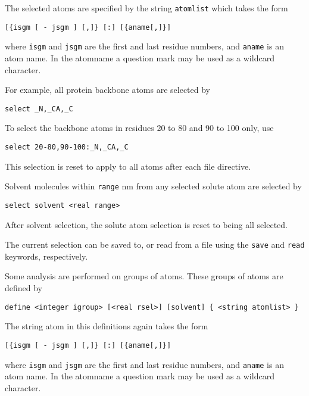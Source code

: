 \par
The selected atoms are specified by the string \verb+atomlist+ which
takes the form

\begin{verbatim}
[{isgm [ - jsgm ] [,]} [:] [{aname[,]}]
\end{verbatim}
where \verb+isgm+ and \verb+jsgm+ are the first and last residue numbers,
and \verb+aname+ is an atom name. In the atomname a question mark may be 
used as a wildcard character. 

For example, all protein backbone atoms are selected by

\begin{verbatim}
select _N,_CA,_C
\end{verbatim}

To select the backbone atoms in residues 20 to 80 and 90 to 100 only, use

\begin{verbatim}
select 20-80,90-100:_N,_CA,_C
\end{verbatim}

This selection is reset to apply to all atoms after each file
directive.

Solvent molecules within \verb+range+ nm from any selected solute atom
are selected by

\begin{verbatim}
select solvent <real range>
\end{verbatim}

After solvent selection, the solute atom selection is reset to being all
selected.

The current selection can be saved to, or read from a file using the 
\verb+save+ and \verb+read+ keywords, respectively.

\par

Some analysis are performed on groups of atoms. These groups of atoms
are defined by

\begin{verbatim}
define <integer igroup> [<real rsel>] [solvent] { <string atomlist> }
\end{verbatim}

The string atom in this definitions again takes the form

\begin{verbatim}
[{isgm [ - jsgm ] [,]} [:] [{aname[,]}]
\end{verbatim}
where \verb+isgm+ and \verb+jsgm+ are the first and last residue numbers,
and \verb+aname+ is an atom name. In the atomname a question mark may be 
used as a wildcard character. 

